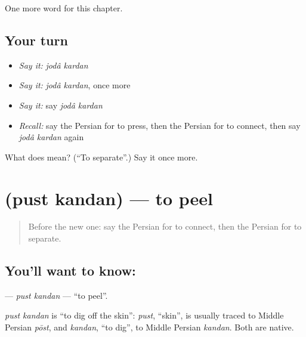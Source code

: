 \begin{grammarlens}[title={What you've built}]
One more word for this chapter.
\end{grammarlens}

\subsection*{Your turn}
\begin{itemize}
\raggedright
  \item \emph{Say it:} \emph{jodâ kardan}
  \item \emph{Say it:} \emph{jodâ kardan}, once more
  \item \emph{Say it:} say \emph{jodâ kardan}
  \item \emph{Recall:} say the Persian for to press, then the Persian for to connect, then say \emph{jodâ kardan} again
\end{itemize}

\begin{tcolorbox}[breakable,colback=teal!4,colframe=teal!35!black,title={Before you move on}]
What does   mean? (\textquotedblleft{}To separate\textquotedblright{}.) Say it once more.
\end{tcolorbox}
\section[\texorpdfstring{\fa{پوست} \fa{کندن} (pust kandan)}{پوست کندن (pust kandan)}]{  (pust kandan) — to peel}

\label{lesson:FA-C224-pust-kandan}



\begin{quote}
Before the new one: say the Persian for to connect, then the Persian for to separate.
\end{quote}

\subsection*{You'll want to know:  }
\textbf{ } — \emph{pust kandan} — \textquotedblleft{}to peel\textquotedblright{}.

\begin{cousinweb}
\emph{pust kandan} is \textquotedblleft{}to dig off the skin\textquotedblright{}: \emph{pust}, \textquotedblleft{}skin\textquotedblright{}, is usually traced to Middle Persian \emph{pōst}, and \emph{kandan}, \textquotedblleft{}to dig\textquotedblright{}, to Middle Persian \emph{kandan}. Both are native.
\end{cousinweb}

